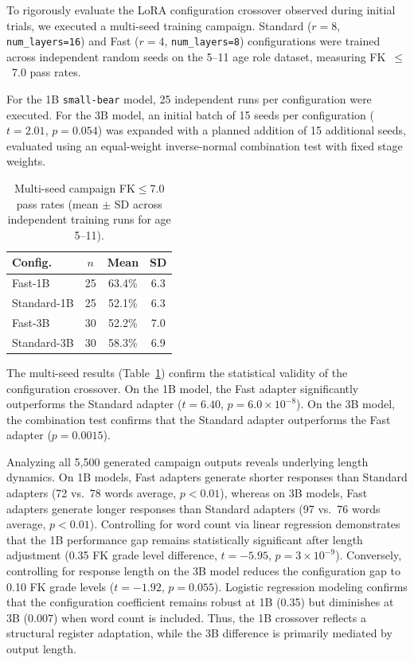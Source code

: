 \documentclass[pdflatex,sn-mathphys-num]{sn-jnl-official}%
\begin{document}
To rigorously evaluate the LoRA configuration crossover observed during initial trials, we executed a multi-seed training campaign. Standard ($r=8$, \texttt{num\_layers=16}) and Fast ($r=4$, \texttt{num\_layers=8}) configurations were trained across independent random seeds on the 5--11 age role dataset, measuring FK~$\leq$~7.0 pass rates.

For the 1B \texttt{small-bear} model, 25 independent runs per configuration were executed. For the 3B model, an initial batch of 15 seeds per configuration ($t=2.01$, $p=0.054$) was expanded with a planned addition of 15 additional seeds, evaluated using an equal-weight inverse-normal combination test with fixed stage weights.

\begin{table}[!h]
  \centering
  \caption{Multi-seed campaign FK$\leq$7.0 pass rates (mean $\pm$ SD across independent training runs for age 5--11).}
  \label{tab:seedcampaign}
  \small
  \begin{tabular}{@{}lccc@{}}
    \toprule
    Config. & $n$ & Mean & SD \\
    \midrule
    Fast-1B     & 25 & 63.4\% & 6.3 \\
    Standard-1B & 25 & 52.1\% & 6.3 \\
    Fast-3B     & 30 & 52.2\% & 7.0 \\
    Standard-3B & 30 & 58.3\% & 6.9 \\
    \bottomrule
  \end{tabular}
\end{table}

The multi-seed results (Table~\ref{tab:seedcampaign}) confirm the statistical validity of the configuration crossover. On the 1B model, the Fast adapter significantly outperforms the Standard adapter ($t=6.40$, $p=6.0\times10^{-8}$). On the 3B model, the combination test confirms that the Standard adapter outperforms the Fast adapter ($p=0.0015$).

Analyzing all 5{,}500 generated campaign outputs reveals underlying length dynamics. On 1B models, Fast adapters generate shorter responses than Standard adapters (72 vs.\ 78 words average, $p<0.01$), whereas on 3B models, Fast adapters generate longer responses than Standard adapters (97 vs.\ 76 words average, $p<0.01$). Controlling for word count via linear regression demonstrates that the 1B performance gap remains statistically significant after length adjustment (0.35 FK grade level difference, $t=-5.95$, $p=3\times10^{-9}$). Conversely, controlling for response length on the 3B model reduces the configuration gap to 0.10 FK grade levels ($t=-1.92$, $p=0.055$). Logistic regression modeling confirms that the configuration coefficient remains robust at 1B (0.35) but diminishes at 3B (0.007) when word count is included. Thus, the 1B crossover reflects a structural register adaptation, while the 3B difference is primarily mediated by output length.
\end{document}
